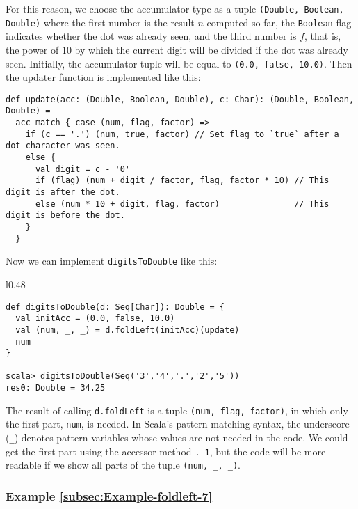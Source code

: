 For this reason, we choose the accumulator type as a tuple \lstinline!(Double, Boolean, Double)!
where the first number is the result $n$ computed so far, the \lstinline!Boolean!
flag indicates whether the dot was already seen, and the third number
is $f$, that is, the power of $10$ by which the current digit will
be divided if the dot was already seen. Initially, the accumulator
tuple will be equal to \lstinline!(0.0, false, 10.0)!. Then the updater
function is implemented like this:
\begin{lstlisting}
def update(acc: (Double, Boolean, Double), c: Char): (Double, Boolean, Double) =
  acc match { case (num, flag, factor) =>
    if (c == '.') (num, true, factor) // Set flag to `true` after a dot character was seen.
    else {
      val digit = c - '0'
      if (flag) (num + digit / factor, flag, factor * 10) // This digit is after the dot.
      else (num * 10 + digit, flag, factor)               // This digit is before the dot.
    }
  }
\end{lstlisting}
Now we can implement \lstinline!digitsToDouble! like this:

\begin{wrapfigure}{l}{0.48\columnwidth}%
\vspace{-0.5\baselineskip}
\begin{lstlisting}
def digitsToDouble(d: Seq[Char]): Double = {
  val initAcc = (0.0, false, 10.0)
  val (num, _, _) = d.foldLeft(initAcc)(update)
  num
}

scala> digitsToDouble(Seq('3','4','.','2','5'))
res0: Double = 34.25
\end{lstlisting}

\vspace{-1.2\baselineskip}
\end{wrapfigure}%

\noindent The result of calling \lstinline!d.foldLeft! is a tuple
\lstinline!(num, flag, factor)!, in which only the first part, \lstinline!num!,
is needed. In Scala\textsf{'}s pattern matching syntax, the underscore (\lstinline!_!)
denotes pattern variables whose values are not needed in the code.
We could get the first part using the accessor method \lstinline!._1!,
but the code will be more readable if we show all parts of the tuple
\lstinline!(num, _, _)!.

\subsubsection{Example \label{subsec:Example-foldleft-7}\ref{subsec:Example-foldleft-7}}

